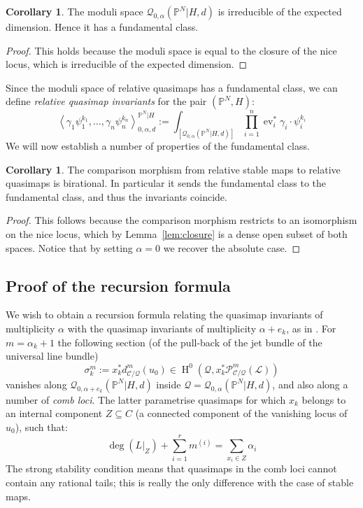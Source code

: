 \documentclass[11pt]{amsart}
\newcommand{\Q}[4]{\mathcal{Q}_{#1,#2}(#3,#4)}
\newcommand{\PP}{\mathbb P}
\newcommand{\HH}{\operatorname{H}}
\newcommand{\ev}{\operatorname{ev}}
\newcommand{\om}[1]{\mathcal{#1}}
\theoremstyle{definition}
\newtheorem{cor}[thm]{Corollary}
\theoremstyle{definition}
\newcommand{\ilemph}[1]{\emph{#1}}
\begin{document}
\begin{cor} The moduli space $\Q{0}{\alpha}{\PP^N|H}{d}$ is irreducible of the expected dimension. Hence it has a fundamental class. \end{cor}
\begin{proof} This holds because the moduli space is equal to the closure of the nice locus, which is irreducible of the expected dimension. \end{proof}

Since the moduli space of relative quasimaps has a fundamental class, we can define \emph{relative quasimap invariants} for the pair $(\PP^N,H)$:
\begin{equation*} \left\langle \gamma_1 \psi_1^{k_1} , \ldots, \gamma_n \psi_n^{k_n} \right\rangle_{0,\alpha,d}^{\PP^N|H} := \int_{[\Q{0}{\alpha}{\PP^N|H}{d}]} \prod_{i=1}^n \ev_i^* \gamma_i \cdot \psi_i^{k_i} \end{equation*}
We will now establish a number of properties of the fundamental class.
\begin{cor} \label{Comparison morphism birational} The comparison morphism from relative stable maps to relative quasimaps is birational. In particular it sends the fundamental class to the fundamental class, and thus the invariants coincide. \end{cor}
\begin{proof} This follows because the comparison morphism restricts to an isomorphism on the nice locus, which by Lemma~\ref{lem:closure} is a dense open subset of both spaces. Notice that by setting $\alpha=0$ we recover the absolute case. \end{proof}


\subsection{Proof of the recursion formula} \label{Subsection recursion formula for PN}
We wish to obtain a recursion formula relating the quasimap invariants of multiplicity $\alpha$ with the quasimap invariants of multiplicity $\alpha + e_k$, as in \cite[Theorem 2.6]{Ga}. For $m = \alpha_k + 1$ the following section (of the pull-back of the jet bundle of the universal line bundle)
\[
\sigma^m_k := x_k^*d^m_{\mathcal C/\om{Q}}(u_0)\in \HH^0(\om{Q},x_k^*\mathcal P^m_{\mathcal C/\mathcal Q}(\mathcal L))
\]
vanishes along $\Q{0}{\alpha+e_k}{\PP^N|H}{d}$ inside $\om{Q} = \Q{0}{\alpha}{\PP^N|H}{d}$, and also along a number of \ilemph{comb loci}.  The latter parametrise quasimaps for which $x_k$ belongs to an internal component $Z \subseteq C$ (a connected component of the vanishing locus of $u_0$), such that:
\begin{equation*}\deg(L|_{Z})+\sum_{i=1}^r m^{(i)}=\sum_{x_i\in Z}\alpha_i \end{equation*}
The strong stability condition means that quasimaps in the comb loci cannot contain any rational tails; this is really the only difference with the case of stable maps.
\end{document}
